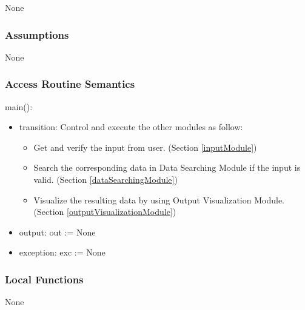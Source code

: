 \documentclass[12pt, titlepage]{article}
\begin{document}
None


\subsubsection{Assumptions}

None

\subsubsection{Access Routine Semantics}

\noindent main():
\begin{itemize}
\item transition: Control and execute the other modules as follow:
\begin{itemize}
\item Get and verify the input from user. (Section \ref{inputModule}) 
\item Search the corresponding data in Data Searching Module if the input is valid. (Section \ref{dataSearchingModule})
\item Visualize the resulting data by using Output Visualization Module. (Section \ref{outputVisualizationModule})

\end{itemize}
\item output: out := None
\item exception: exc := None
\end{itemize}



\subsubsection{Local Functions}
None
  
\end{document}
